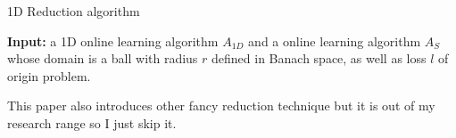 \begin{algorithm}
\caption{1D Reduction algorithm}
\label{alg:1DReduction}
{\bfseries Input:} a 1D online learning algorithm $A_{1D}$ and a online learning algorithm $A_S$ whose domain is a ball with radius $r$ defined in Banach space, as well as loss $l$ of origin problem.
\begin{algorithmic}[1]
\EndFor
\end{algorithmic}
\end{algorithm}

This paper also introduces other fancy reduction technique but it is out of my research range so I just skip it.


